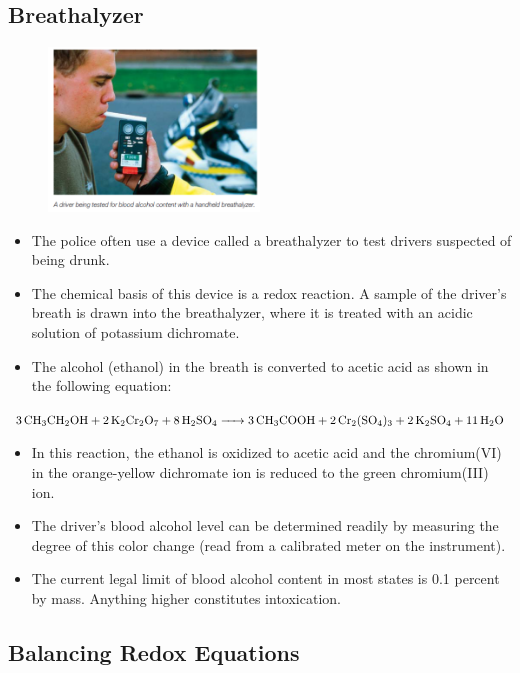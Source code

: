 \documentclass[a4paper,12pt,twocolumn]{article}
\begin{document}
\subsection{Breathalyzer}
\begin{figure}[h]
\centering
\includegraphics[width=0.5\textwidth]{breathalyzer.png}
\end{figure}
\begin{itemize}
\item The police often use a device called a breathalyzer to test drivers suspected of being drunk. 
\item The chemical basis of this device is a redox reaction. A sample of the driver’s breath is drawn into the breathalyzer, where it is treated with an acidic solution of potassium dichromate. 
\item The alcohol (ethanol) in the breath is converted to acetic acid as shown in the following equation:\\
\end{itemize}

\begin{Box1}{}
$\ce{3CH3CH2OH + 2K2Cr2O7 + 8H2SO4 -> 3CH3COOH + 2Cr2(SO4)3 + 2K2SO4 + 11H2O}$
\end{Box1}
\begin{itemize}
\item In this reaction, the ethanol is oxidized to acetic acid and the chromium(VI) in the orange-yellow dichromate ion is reduced to the green chromium(III) ion. 
\item The driver’s blood alcohol level can be determined readily by measuring the degree of this color change (read from a calibrated meter on the instrument). 
\item The current legal limit of blood alcohol content in most states is 0.1 percent by mass. Anything higher constitutes intoxication.

\end{itemize}

\subsection{Balancing Redox Equations}
\end{document}
